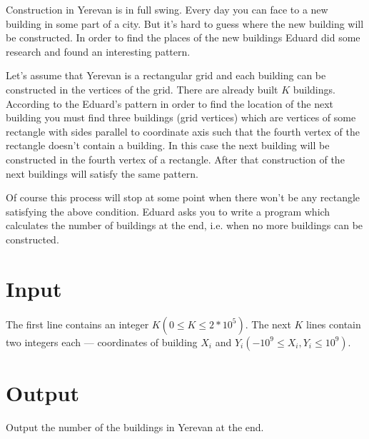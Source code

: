 
Construction in Yerevan is in full swing. Every day you can face to a new building in some part of a city. But it's hard to guess where the new building will be constructed. In order to find the places of the new buildings Eduard did some research and found an interesting pattern.

Let's assume that Yerevan is a rectangular grid and each building can be constructed in the vertices of the grid. There are already built $K$ buildings. According to the Eduard's pattern in order to find the location of the next building you must find three buildings (grid vertices) which are vertices of some rectangle with sides parallel to coordinate axis such that the fourth vertex of the rectangle doesn't contain a building. In this case the next building will be constructed in the fourth vertex of a rectangle. After that construction of the next buildings will satisfy the same pattern.

Of course this process will stop at some point when there won't be any rectangle satisfying the above condition. Eduard asks you to write a program which calculates the number of buildings at the end, i.e. when no more buildings can be constructed.

\section*{Input}
The first line contains an integer $K (0 \leq K \leq 2*10^5)$. The next $K$ lines contain two integers each — coordinates of building $X_i$ and $Y_i (−10^9 \leq X_i, Y_i \leq 10^9)$.

\section*{Output}
Output the number of the buildings in Yerevan at the end.
